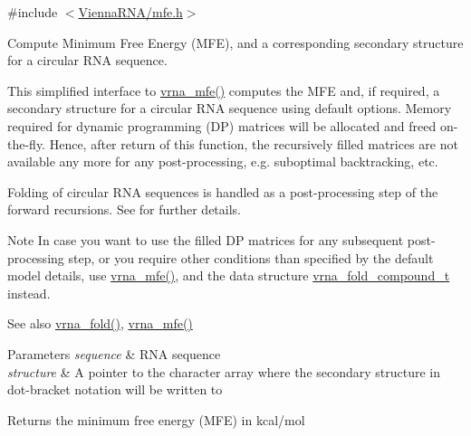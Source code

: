 {\ttfamily \#include $<$\hyperlink{mfe_8h}{Vienna\+R\+N\+A/mfe.\+h}$>$}



Compute Minimum Free Energy (M\+FE), and a corresponding secondary structure for a circular R\+NA sequence. 

This simplified interface to \hyperlink{group__mfe__global_gabd3b147371ccf25c577f88bbbaf159fd}{vrna\+\_\+mfe()} computes the M\+FE and, if required, a secondary structure for a circular R\+NA sequence using default options. Memory required for dynamic programming (DP) matrices will be allocated and free\textquotesingle{}d on-\/the-\/fly. Hence, after return of this function, the recursively filled matrices are not available any more for any post-\/processing, e.\+g. suboptimal backtracking, etc.

Folding of circular R\+NA sequences is handled as a post-\/processing step of the forward recursions. See \cite{hofacker:2006} for further details.

\begin{DoxyNote}{Note}
In case you want to use the filled DP matrices for any subsequent post-\/processing step, or you require other conditions than specified by the default model details, use \hyperlink{group__mfe__global_gabd3b147371ccf25c577f88bbbaf159fd}{vrna\+\_\+mfe()}, and the data structure \hyperlink{group__fold__compound_ga1b0cef17fd40466cef5968eaeeff6166}{vrna\+\_\+fold\+\_\+compound\+\_\+t} instead.
\end{DoxyNote}
\begin{DoxySeeAlso}{See also}
\hyperlink{group__mfe__global_ga29a33b2895f4e67b0480271ff289afdc}{vrna\+\_\+fold()}, \hyperlink{group__mfe__global_gabd3b147371ccf25c577f88bbbaf159fd}{vrna\+\_\+mfe()}
\end{DoxySeeAlso}

\begin{DoxyParams}{Parameters}
{\em sequence} & R\+NA sequence \\
\hline
{\em structure} & A pointer to the character array where the secondary structure in dot-\/bracket notation will be written to \\
\hline
\end{DoxyParams}
\begin{DoxyReturn}{Returns}
the minimum free energy (M\+FE) in kcal/mol 
\end{DoxyReturn}
\mbox{\label{group__mfe__global_ga6c9d3bef3e92c6d423ffac9f981418c1}} 
